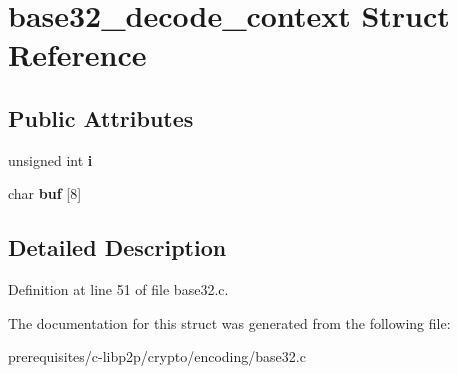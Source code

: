 \hypertarget{structbase32__decode__context}{}\section{base32\+\_\+decode\+\_\+context Struct Reference}
\label{structbase32__decode__context}
\subsection*{Public Attributes}
\begin{DoxyCompactItemize}
\item 
\mbox{\label{structbase32__decode__context_a0879b3e7cc0fa96e2ca6542b4a79849b}} 
unsigned int {\bfseries i}
\item 
\mbox{\label{structbase32__decode__context_a9842181a9377602c2e6d70333fc6720b}} 
char {\bfseries buf} \mbox{[}8\mbox{]}
\end{DoxyCompactItemize}


\subsection{Detailed Description}


Definition at line 51 of file base32.\+c.



The documentation for this struct was generated from the following file\+:\begin{DoxyCompactItemize}
\item 
prerequisites/c-\/libp2p/crypto/encoding/base32.\+c\end{DoxyCompactItemize}
